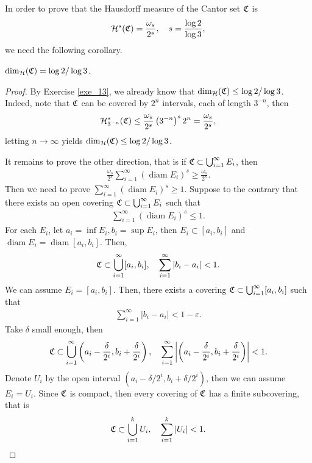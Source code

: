 In order to prove that the Hausdorff measure of the Cantor set $\mathfrak{C}$ is 
\begin{align*}
    {\mathcal H}^s(\mathfrak{C}) = \frac{\omega_s}{2^s}, \quad s = \frac{\log 2}{\log 3},
\end{align*}
we need the following corollary.

\medskip

\begin{corollary}
$\dim_{{\mathcal H}}(\mathfrak{C}) = \log 2 / \log 3$.
\end{corollary}
\begin{proof}
By Exercise \ref{exe_13}, we already know that $\dim_{{\mathcal H}}(\mathfrak{C}) \leq \log 2 / \log 3$.  Indeed, note that $\mathfrak{C}$ can be covered by $2^n$ intervals, each of length $3^{-n}$, then
\begin{align*}
    {\mathcal H}^s_{3^{-n}}(\mathfrak{C}) \leq \frac{\omega_s}{2^s} \left(3^{-n}\right)^s 2^n = \frac{\omega_s}{2^s},
\end{align*}
letting $n\to\infty$ yields $\dim_{{\mathcal H}}(\mathfrak{C}) \leq \log 2 / \log 3$.

It remains to prove the other direction, that is if $\mathfrak{C} \subset \bigcup^\infty_{i=1} E_i$, then 
\begin{align*}
    \frac{\omega_s}{2^s} \sum^\infty_{i=1} (\operatorname{diam} E_i)^s \geq \frac{\omega_s}{2^s}.
\end{align*}
Then we need to prove $\sum^\infty_{i=1} (\operatorname{diam} E_i)^s \geq 1$. Suppose to the contrary that there exists an open covering $\mathfrak{C} \subset \bigcup^\infty_{i=1} E_i$ such that 
\begin{align*}
    \sum^\infty_{i=1} (\operatorname{diam} E_i)^s \leq 1.
\end{align*}
For each $E_i$, let $a_i = \inf E_i, b_i = \sup E_i$, then $E_i \subset [a_i,b_i]$ and $\operatorname{diam} E_i = \operatorname{diam} [a_i,b_i]$. Then, 
\begin{align*}
    \mathfrak{C} \subset \bigcup^\infty_{i=1} [a_i,b_i], \quad \sum^\infty_{i=1} \left|b_i - a_i\right| < 1.
\end{align*}
We can assume $E_i = [a_i,b_i]$. Then, there exists a covering $\mathfrak{C} \subset \bigcup^\infty_{i=1} [a_i,b_i]$ such that 
\begin{align*}
    \sum^\infty_{i=1} \left|b_i - a_i\right| < 1 - \varepsilon.
\end{align*}
Take $\delta$ small enough, then 
\begin{align*}
    \mathfrak{C} \subset \bigcup^\infty_{i=1} \left(a_i-\frac{\delta}{2^i},b_i+\frac{\delta}{2^i}\right), \quad \sum^\infty_{i=1} \left|\left(a_i-\frac{\delta}{2^i},b_i+\frac{\delta}{2^i}\right)\right| < 1.
\end{align*}
Denote $U_i$ by the open interval $\left(a_i-\delta/2^i,b_i+\delta/2^i\right)$, then we can assume $E_i = U_i$. Since $\mathfrak{C}$ is compact, then every covering of $\mathfrak{C}$ has a finite subcovering, that is
\begin{align*}
    \mathfrak{C} \subset \bigcup^k_{i=1} U_i, \quad \sum^k_{i=1} \left|U_i\right| < 1.
\end{align*}


\end{proof}
